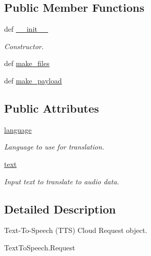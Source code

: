 \subsection*{Public Member Functions}
\begin{DoxyCompactItemize}
\item 
def \hyperlink{classRappCloud_1_1CloudMsgs_1_1TextToSpeech_1_1TextToSpeech_1_1Request_af5b708402afddd94de162bca3c83b876}{\-\_\-\-\_\-init\-\_\-\-\_\-}
\begin{DoxyCompactList}\small\item\em Constructor. \end{DoxyCompactList}\item 
def \hyperlink{classRappCloud_1_1CloudMsgs_1_1TextToSpeech_1_1TextToSpeech_1_1Request_a4bc8747f508265eaa14217a3d7336ee7}{make\-\_\-files}
\item 
def \hyperlink{classRappCloud_1_1CloudMsgs_1_1TextToSpeech_1_1TextToSpeech_1_1Request_a1d1a457e3b103a4bfe915e56304001e8}{make\-\_\-payload}
\end{DoxyCompactItemize}
\subsection*{Public Attributes}
\begin{DoxyCompactItemize}
\item 
\hyperlink{classRappCloud_1_1CloudMsgs_1_1TextToSpeech_1_1TextToSpeech_1_1Request_aa461223e16c93201336a4ef5f3196094}{language}
\begin{DoxyCompactList}\small\item\em Language to use for translation. \end{DoxyCompactList}\item 
\hyperlink{classRappCloud_1_1CloudMsgs_1_1TextToSpeech_1_1TextToSpeech_1_1Request_a527e571b5f803415a6cd5f4a8606ea3b}{text}
\begin{DoxyCompactList}\small\item\em Input text to translate to audio data. \end{DoxyCompactList}\end{DoxyCompactItemize}


\subsection{Detailed Description}
\begin{DoxyVerb}Text-To-Speech (TTS) Cloud Request object.

TextToSpeech.Request
\end{DoxyVerb}
 

